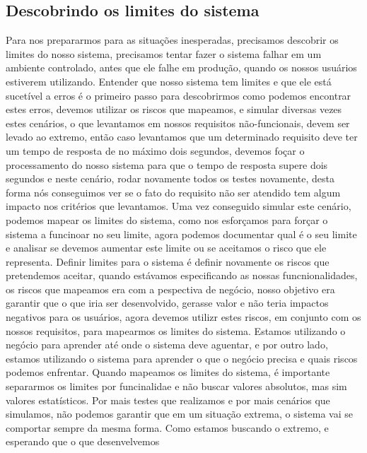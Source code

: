     \subsection{Descobrindo os limites do sistema}
    Para nos prepararmos para as situações inesperadas, precisamos descobrir os
    limites do nosso sistema, precisamos tentar fazer o sistema falhar em um
    ambiente controlado, antes que ele falhe em produção, quando os nossos usuários
    estiverem utilizando. Entender que nosso sistema tem limites e que ele está
    sucetível a erros é o primeiro passo para descobrirmos como podemos encontrar
    estes erros, devemos utilizar os riscos que mapeamos, e simular diversas vezes
    estes cenários, o que levantamos em nossos requisitos não-funcionais, devem
    ser levado ao extremo, então caso levantamos que um determinado requisito
    deve ter um tempo de resposta de no máximo dois segundos, devemos foçar o
    processamento do nosso sistema para que o tempo de resposta supere dois segundos
    e neste cenário, rodar novamente todos os testes novamente, desta forma nós
    conseguimos ver se o fato do requisito não ser atendido tem algum impacto nos
    critérios que levantamos. Uma vez conseguido simular este cenário, podemos
    mapear os limites do sistema, como nos esforçamos para forçar o sistema a
    funcinoar no seu limite, agora podemos documentar qual é o seu limite e
    analisar se devemos aumentar este limite ou se aceitamos o risco que ele
    representa. \newline
    Definir limites para o sistema é definir novamente os riscos que pretendemos
    aceitar, quando estávamos especificando as nossas funcnionalidades, os riscos
    que mapeamos era com a pespectiva de negócio, nosso objetivo era garantir que
    o que iria ser desenvolvido, gerasse valor e não teria impactos negativos para
    os usuários, agora devemos utilizr estes riscos, em conjunto com os nossos
    requisitos, para mapearmos os limites do sistema. Estamos utilizando o negócio
    para aprender até onde o sistema deve aguentar, e por outro lado, estamos
    utilizando o sistema para aprender o que o negócio precisa e quais riscos
    podemos enfrentar. \newline
    Quando mapeamos os limites do sistema, é importante separarmos os limites por
    funcinalidae e não buscar valores absolutos, mas sim valores estatísticos.
    Por mais testes que realizamos e por mais cenários que simulamos, não podemos
    garantir que em um situação extrema, o sistema vai se comportar sempre da
    mesma forma. Como estamos buscando o extremo, e esperando que o que desenvelvemos
